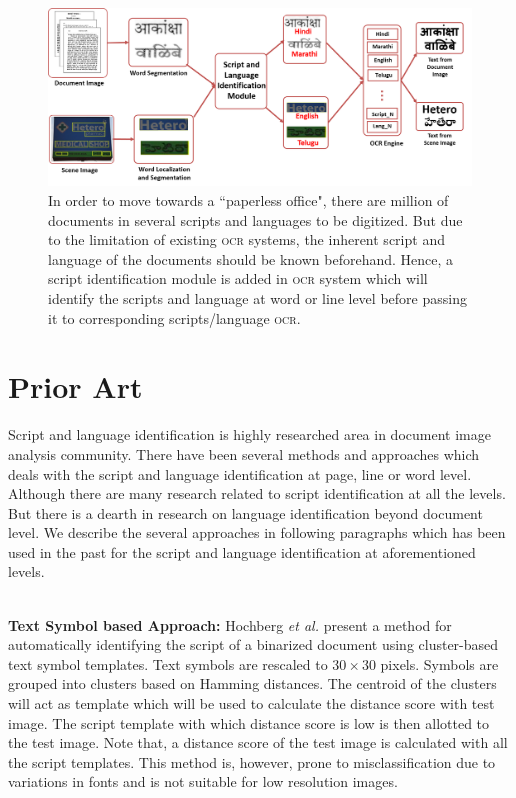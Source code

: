 \begin{figure}
\centering
\includegraphics[scale=0.45]{figures/motivationScript.png}
\caption{ In order to move towards a ``paperless office", there are million of documents in several scripts and languages to be digitized. But due to the limitation of existing \textsc{ocr} systems, the inherent script and language of the documents should be known beforehand. Hence, a script identification module is added in \textsc{ocr} system which will identify the scripts and language at word or line level before passing it to corresponding scripts/language \textsc{ocr}.}
\label{fig:motivation}
\end{figure}

\section{Prior Art}
\label{sec:prior}

Script and language identification is highly researched area in document image analysis community. There have been several methods and approaches which deals with the script and language identification at page, line or word level. Although there are many research related to script identification at all the levels. But there is a dearth in research on language identification beyond document level. We describe the several approaches in following paragraphs which has been used in the past for the script and language identification at aforementioned levels.
\\
\


\noindent\textbf{Text Symbol based Approach:} Hochberg \textit{et al.} present a method for automatically identifying the script of a binarized document using cluster-based text symbol templates. Text symbols are rescaled to $30\times 30$ pixels. Symbols are grouped into clusters based on Hamming distances. The centroid of the clusters will act as template which will be used to calculate the distance score with test image. The script template with which distance score is low is then allotted to the test image. Note that, a distance score of the test image is calculated with all the script templates. This method is, however, prone to misclassification due to variations in fonts and is not suitable for low resolution images.
\\
\


